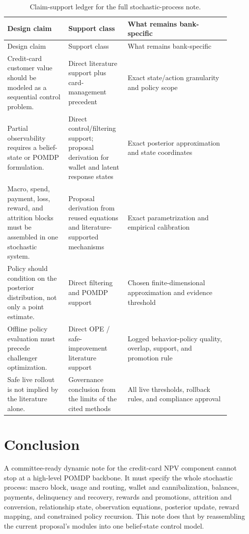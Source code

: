 \documentclass[11pt]{article}
\newcommand{\1}{\mathbf{1}}
\theoremstyle{definition}
\begin{document}
\begin{longtable}{L{0.25\linewidth}L{0.23\linewidth}L{0.42\linewidth}}
\caption{Claim-support ledger for the full stochastic-process note.}
\label{tab:audit-ledger}\\
\toprule
Design claim & Support class & What remains bank-specific \\
\midrule
\endfirsthead
\toprule
Design claim & Support class & What remains bank-specific \\
\midrule
\endhead
Credit-card customer value should be modeled as a sequential control problem.
  & Direct literature support plus card-management precedent
  & Exact state/action granularity and policy scope \\
Partial observability requires a belief-state or POMDP formulation.
  & Direct control/filtering support; proposal derivation for wallet and latent
    response states
  & Exact posterior approximation and state coordinates \\
Macro, spend, payment, loss, reward, and attrition blocks must be assembled in
one stochastic system.
  & Proposal derivation from reused equations and literature-supported
    mechanisms
  & Exact parametrization and empirical calibration \\
Policy should condition on the posterior distribution, not only a point estimate.
  & Direct filtering and POMDP support
  & Chosen finite-dimensional approximation and evidence threshold \\
Offline policy evaluation must precede challenger optimization.
  & Direct OPE / safe-improvement literature support
  & Logged behavior-policy quality, overlap, support, and promotion rule \\
Safe live rollout is not implied by the literature alone.
  & Governance conclusion from the limits of the cited methods
  & All live thresholds, rollback rules, and compliance approval \\
\bottomrule
\end{longtable}

\section{Conclusion}

A committee-ready dynamic note for the credit-card NPV component cannot stop at
a high-level POMDP backbone. It must specify the whole stochastic process:
macro block, usage and routing, wallet and cannibalization, balances, payments,
delinquency and recovery, rewards and promotions, attrition and conversion,
relationship state, observation equations, posterior update, reward mapping, and
constrained policy recursion. This note does that by reassembling the current
proposal's modules into one belief-state control model.
\end{document}

